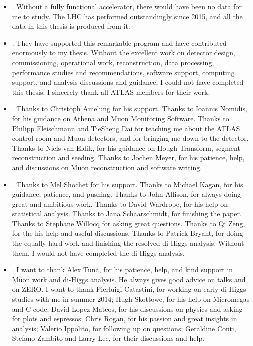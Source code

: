 \begin{itemize}
	\item {}. Without a fully functional accelerator, there would have been no data for me to study. The LHC has performed outstandingly since 2015, and all the data in this thesis is produced from it. 
	\item {}. They have supported this remarkable program and have contributed enormously to my thesis. Without the excellent work on detector design, commissioning, operational work, reconstruction, data processing, performance studies and recommendations, software support, computing support, and analysis discussions and guidance, I could not have completed this thesis. I sincerely thank all ATLAS members for their work.
	\item {}. Thanks to Christoph Amelung for his support. Thanks to Ioannis Nomidis, for his guidance on Athena and Muon Monitoring Software. Thanks to Philipp Fleischmann and TieSheng Dai for teaching me about the ATLAS control room and Muon detectors, and for bringing me down to the detector. Thanks to Niels van Eldik, for his guidance on Hough Transform, segment reconstruction and seeding. Thanks to Jochen Meyer, for his patience, help, and discussions on Muon reconstruction and software writing.
	\item {}. Thanks to Mel Shochet for his support. Thanks to Michael Kagan, for his guidance, patience, and pushing. Thanks to John Allison, for always doing great and ambitious work. Thanks to David Wardrope, for his help on statistical analysis. Thanks to Jana Schaarschmidt, for finishing the paper. Thanks to Stephane Willocq for asking great questions. Thanks to Qi Zeng, for the his help and useful discussions. Thanks to Patrick Bryant, for doing the equally hard work and finishing the resolved di-Higgs analysis. Without them, I would not have completed the di-Higgs analysis.
	\item {}. I want to thank Alex Tuna, for his patience, help, and kind support in Muon work and di-Higgs analysis. He always gives good advice on talks and on ZERO. I want to thank Pierluigi Catastini, for working on early di-Higgs studies with me in summer 2014; Hugh Skottowe, for his help on Micromegas and C code; David Lopez Mateos, for his discussions on physics and asking for plots and espressos; Chris Rogan, for his passion and great insights in analysis; Valerio Ippolito, for following up on questions; Geraldine Conti, Stefano Zambito and Larry Lee, for their discussions and help.

\end{itemize}
